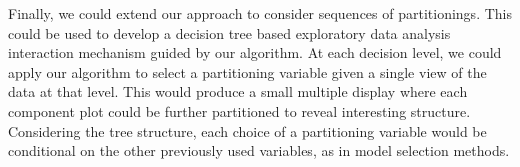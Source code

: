 Finally, we could extend our approach to consider sequences of partitionings. This could be used to develop a decision tree based exploratory data analysis interaction mechanism guided by our algorithm. At each decision level, we could apply our algorithm to select a partitioning variable given a single view of the data at that level. This would produce a small multiple display where each component plot could be further partitioned to reveal interesting structure. Considering the tree structure, each choice of a partitioning variable would be conditional on the other previously used variables, as in model selection methods. 

